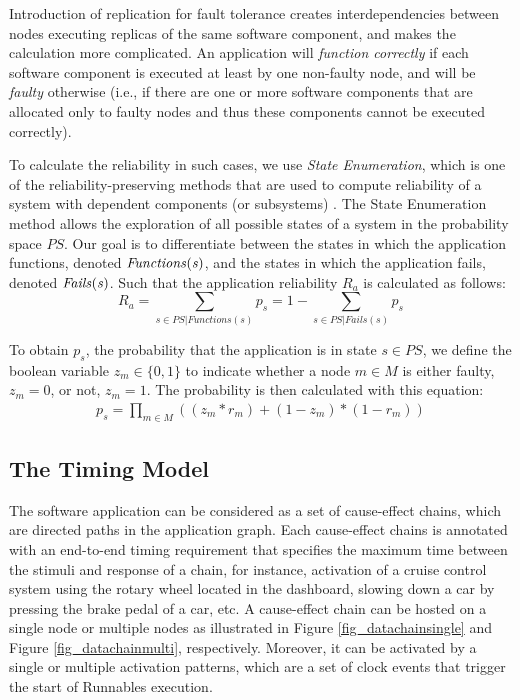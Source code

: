 Introduction of replication for fault tolerance creates interdependencies between nodes executing replicas of the same software component, and makes the calculation more complicated. An application will \textit{function correctly} if each software component is executed at least by one non-faulty node, and will be \textit{faulty} otherwise (i.e., if there are one or more software components that are allocated only to faulty nodes and thus these components cannot be executed correctly).

To calculate the reliability in such cases, we use \textit{State Enumeration}, which is one of the reliability-preserving methods that are used to compute reliability of a system with dependent components (or subsystems) \cite{Lucet1999ExactReliability}. The State Enumeration method allows the exploration of all possible states of a system in the probability space $P\!S$. Our goal is to differentiate between the states in which the application functions, denoted $\mbox{\it Functions(s)}$, and the states in which the application fails, denoted $\mbox{\it Fails(s)}$. Such that the application reliability $R_a$ is calculated as follows:
\begin{equation}
\label{eqn_appreliability}
R_a=\sum_{s\in PS|Functions(s)}p_s=1-\sum_{s\in PS|Fails(s)}p_s
\end{equation}

To obtain $p_s$, the probability that the application is in state $s\in PS$, we define the boolean variable $z_m \in \{0,1\}$ to indicate whether a node $m \in M$ is either faulty, $z_m = 0$, or not, $z_m = 1$. The probability is then calculated with this equation:
\begin{align}
\label{eqn_stateprobability}
p_s=\prod_{m\in M}((z_m*r_m) + (1-z_m)*(1-r_m))
\end{align}

\subsection{The Timing Model}
The software application can be considered as a set of cause-effect chains, which are directed paths in the application graph. Each cause-effect chains is annotated with an end-to-end timing requirement that specifies the maximum time between the stimuli and response of a chain, for instance, activation of a cruise control system using the rotary wheel located in the dashboard, slowing down a car by pressing the brake pedal of a car, etc. A cause-effect chain can be hosted on a single node or multiple nodes as illustrated in Figure \ref{fig_datachainsingle} and Figure \ref{fig_datachainmulti}, respectively. Moreover, it can be activated by a single or multiple activation patterns, which are a set of clock events that trigger the start of Runnables execution. 

